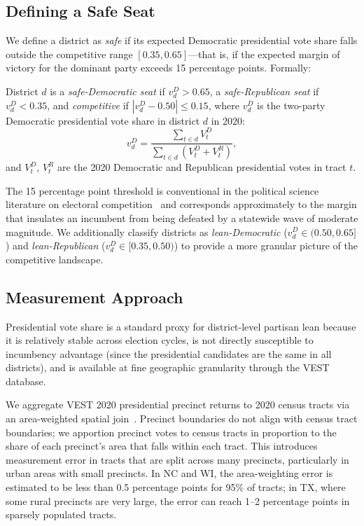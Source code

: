 \label{sec:background}

\subsection{Defining a Safe Seat}

We define a district as \textit{safe} if its expected Democratic presidential vote
share falls outside the competitive range $[0.35, 0.65]$---that is, if the expected
margin of victory for the dominant party exceeds 15 percentage points. Formally:

\begin{definition}
District $d$ is a \emph{safe-Democratic seat} if $v_d^D > 0.65$, a
\emph{safe-Republican seat} if $v_d^D < 0.35$, and \emph{competitive} if
$|v_d^D - 0.50| \leq 0.15$, where $v_d^D$ is the two-party Democratic presidential
vote share in district $d$ in 2020:
\[
  v_d^D = \frac{\sum_{t \in d} V_t^D}{\sum_{t \in d} (V_t^D + V_t^R)},
\]
and $V_t^D$, $V_t^R$ are the 2020 Democratic and Republican presidential votes in
tract $t$.
\end{definition}

The 15 percentage point threshold is conventional in the political science literature
on electoral competition~\citep{fiorina1980incumbency} and corresponds approximately
to the margin that insulates an incumbent from being defeated by a statewide wave of
moderate magnitude. We additionally classify districts as \textit{lean-Democratic}
($v_d^D \in (0.50, 0.65]$) and \textit{lean-Republican} ($v_d^D \in [0.35, 0.50)$)
to provide a more granular picture of the competitive landscape.

\subsection{Measurement Approach}

Presidential vote share is a standard proxy for district-level partisan lean because
it is relatively stable across election cycles, is not directly susceptible to
incumbency advantage (since the presidential candidates are the same in all districts),
and is available at fine geographic granularity through the VEST database.

We aggregate VEST 2020 presidential precinct returns to 2020 census tracts via an
area-weighted spatial join~\citep{vest2020}. Precinct boundaries do not align with
census tract boundaries; we apportion precinct votes to census tracts in proportion to
the share of each precinct's area that falls within each tract. This introduces
measurement error in tracts that are split across many precincts, particularly in
urban areas with small precincts. In NC and WI, the area-weighting error is estimated
to be less than 0.5 percentage points for 95\% of tracts; in TX, where some rural
precincts are very large, the error can reach 1--2 percentage points in sparsely
populated tracts.

